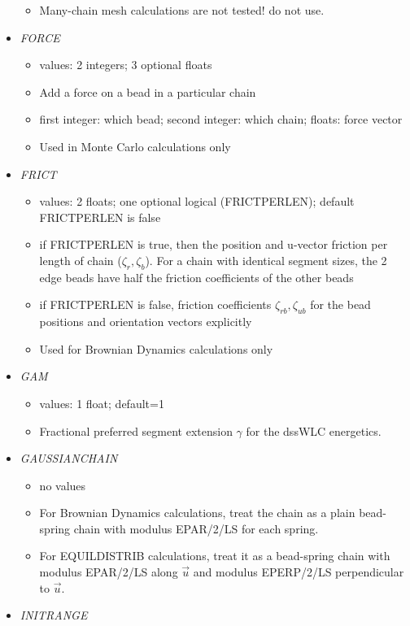 \documentclass[12pt]{article}
\begin{document}
\begin{itemize}
\begin{itemize}
    \item {\color{red} Many-chain mesh calculations are not tested! do not use.}
  \end{itemize}
%
\item {\it FORCE}
  \begin{itemize}
    \item values: 2 integers; 3 optional floats
    \item Add a force on a bead in a particular chain
    \item first integer: which bead; second integer: which chain; floats: force vector
    \item Used in Monte Carlo calculations only
  \end{itemize}
%
\item {\it FRICT}
  \begin{itemize}
    \item values: 2 floats; one optional logical (FRICTPERLEN); default FRICTPERLEN is false
    \item if FRICTPERLEN is true, then the position and u-vector friction per length of chain ($\zeta_r, \zeta_b$). For a chain with identical segment sizes, the 2 edge beads have half the friction coefficients of the other beads
    \item if FRICTPERLEN is false, friction coefficients $\zeta_{rb}, \zeta_{ub}$ for the bead positions and orientation vectors explicitly      
    \item Used for Brownian Dynamics calculations only
  \end{itemize}
%
\item {\it GAM}
  \begin{itemize}
    \item values: 1 float; default=1
    \item Fractional preferred segment extension $\gamma$ for the dssWLC energetics.
  \end{itemize}
%
\item {\it GAUSSIANCHAIN}
  \begin{itemize}
    \item no values
    \item For Brownian Dynamics calculations, treat the chain as a plain bead-spring chain with modulus EPAR/2/LS for each spring.
    \item For EQUILDISTRIB calculations, treat it as a bead-spring chain with modulus EPAR/2/LS along $\vec{u}$ and modulus EPERP/2/LS perpendicular to $\vec{u}$.
  \end{itemize}
%
\item {\it INITRANGE}

\end{itemize}
\end{document}
